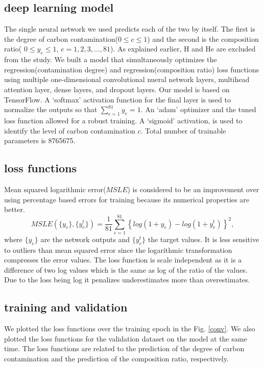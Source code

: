 \documentclass[preprint,aps,floatfix,showpacs]{revtex4-2}
\begin{document}
\subsection{deep learning model}
The single neural network we used predicts each of the two by itself. The first is the degree of carbon contamination($0 \le c \le 1$) and the second is the composition ratio( $0 \le y_e \le 1$, $e=1, 2, 3, \ldots, 81$). As explained earlier, H and He are excluded from the study.
We built a model that simultaneously optimizes the regression(contamination degree) and regression(composition ratio) loss functions using multiple one-dimensional convolutional nueral network layers, multihead attention layer, dense layers, and dropout layers. 
Our model is based on TensorFlow.
A `softmax' activation function for the final layer is used to normalize the outputs so that ${\sum }_{e=1}^{81}{y}_{e}=1$.
An `adam' optimizer\cite{kingma2014adam} and the tuned loss function allowed for a robust training.
A `sigmoid' activation, is used to identify the level of carbon contamination $c$.
Total number of trainable parameters is  8765675.

\subsection{loss functions}
Mean squared logarithmic error($MSLE$) is considered to be an improvement over using percentage based errors for training because its numerical properties are better.
\begin{equation}
	MSLE(\{y_e\}, \{y_e^t\}) = \frac{1}{81} \sum_{e=1}^{81}\left\{log(1+y_e)-log(1+y^t_e)  \right\}^2,
	\label{eq:msle}
\end{equation}
where $\{y_e\}$ are the network outputs and $\{y_e^t\}$ the target values. 
It is less sensitive to outliers than mean squared error since the logarithmic transformation compresses the error values.
The loss function is scale independent as it is a difference of two log values which is the same as log of the ratio of the values. 
Due to the loss being log it penalizes underestimates more than overestimates.


\subsection{training and validation}
We plotted the loss functions over the training epoch in the Fig. \ref{conv}. We also plotted the loss functions for the validation dataset on the model at the same time. The loss functions are related to the prediction of the degree of carbon contamination and the prediction of the composition ratio, respectively.
\end{document}
